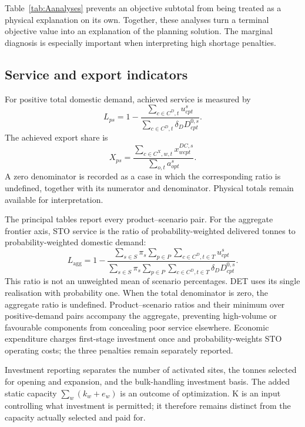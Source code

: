 \documentclass[11pt,a4paper]{article}
\begin{document}
Table~\ref{tab:Aanalyses} prevents an objective subtotal from being treated as a physical explanation on its own. Together, these analyses turn a terminal objective value into an explanation of the planning solution. The marginal diagnosis is especially important when interpreting high shortage penalties.

\subsection{Service and export indicators}

For positive total domestic demand, achieved service is measured by
\begin{equation}
 L_{ps}=
 1-\frac{\sum_{c\in C^D,t}u^s_{cpt}}
          {\sum_{c\in C^D,t}\delta_D D^{0,s}_{cpt}}.
 \label{eq:achievedservice}
\end{equation}
The achieved export share is
\begin{equation}
 X_{ps}=
 \frac{\sum_{c\in C^X,w,t}x^{DC,s}_{wcpt}}
      {\sum_{o,t}a^s_{opt}}.
 \label{eq:exportshare}
\end{equation}
A zero denominator is recorded as a case in which the corresponding ratio is undefined, together with its numerator and denominator. Physical totals remain available for interpretation.

The principal tables report every product--scenario pair. For the aggregate frontier axis, STO service is the ratio of probability-weighted delivered tonnes to probability-weighted domestic demand:
\begin{equation}
 L_{\mathrm{agg}}=
 1-\frac{\sum_{s\in S}\pi_s\sum_{p\in P}\sum_{c\in C^D,t\in T}u^s_{cpt}}
         {\sum_{s\in S}\pi_s\sum_{p\in P}\sum_{c\in C^D,t\in T}\delta_D D^{0,s}_{cpt}}.
 \label{eq:aggregateservice}
\end{equation}
This ratio is not an unweighted mean of scenario percentages. DET uses its single realisation with probability one. When the total denominator is zero, the aggregate ratio is undefined. Product--scenario ratios and their minimum over positive-demand pairs accompany the aggregate, preventing high-volume or favourable components from concealing poor service elsewhere. Economic expenditure charges first-stage investment once and probability-weights STO operating costs; the three penalties remain separately reported.

Investment reporting separates the number of activated sites, the tonnes selected for opening and expansion, and the bulk-handling investment basis. The added static capacity $\sum_w(k_w+e_w)$ is an outcome of optimization. K is an input controlling what investment is permitted; it therefore remains distinct from the capacity actually selected and paid for.
\end{document}
